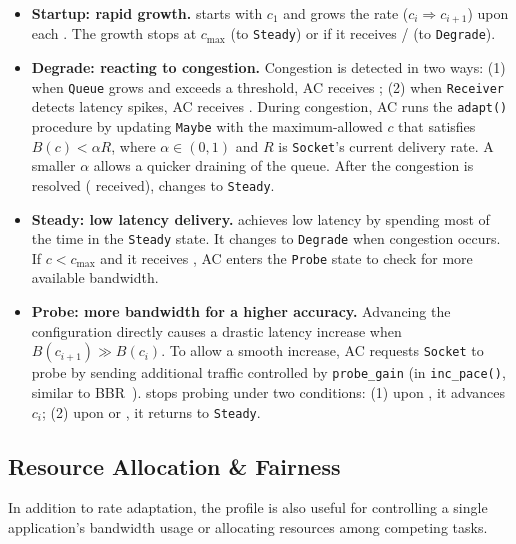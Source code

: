 \begin{itemize}[leftmargin=*, topsep=3pt, itemsep=0pt]

\item \textbf{Startup: rapid growth.} \sysname{} starts with $c_1$ and grows the
  rate ($c_i \Rightarrow c_{i+1}$) upon each \qe{}. The growth stops at
  $c_{\max}$ (to \texttt{Steady}) or if it receives \qc{}/\rc{} (to
  \texttt{Degrade}).

\item \textbf{Degrade: reacting to congestion.} Congestion is detected in two
  ways: (1) when \texttt{Queue} grows and exceeds a threshold, AC receives
  \qc{}; (2) when \texttt{Receiver} detects latency spikes, AC receives
  \rc{}. During congestion, AC runs the \texttt{adapt()} procedure by updating
  \texttt{Maybe} with the maximum-allowed $c$ that satisfies $B(c) < \alpha R$,
  where $\alpha \in (0, 1)$ and $R$ is \texttt{Socket}'s current delivery
  rate. A smaller $\alpha$ allows a quicker draining of the queue. After the
  congestion is resolved (\qe{} received), \sysname{} changes to
  \texttt{Steady}.

\item \textbf{Steady: low latency delivery.} \sysname{} achieves low latency by
  spending most of the time in the \texttt{Steady} state. It changes to
  \texttt{Degrade} when congestion occurs. If $c < c_{\max}$ and it receives
  \qe{}, AC enters the \texttt{Probe} state to check for more available
  bandwidth.

\item \textbf{Probe: more bandwidth for a higher accuracy.} Advancing the
  configuration directly causes a drastic latency increase when
  $B(c_{i+1}) \gg B(c_i)$. To allow a smooth increase, AC requests
  \texttt{Socket} to probe by sending additional traffic controlled by
  \texttt{probe\_gain} (in \texttt{inc\_pace()}, similar to
  BBR~\cite{cardwell2017bbr}). \sysname{} stops probing under two conditions:
  (1) upon \spd{}, it advances $c_i$; (2) upon \qc{} or \rc{}, it returns to
  \texttt{Steady}.

\end{itemize}

\subsection{Resource Allocation \& Fairness}

In addition to rate adaptation, the profile is also useful for controlling a
single application's bandwidth usage or allocating resources among competing
tasks.

